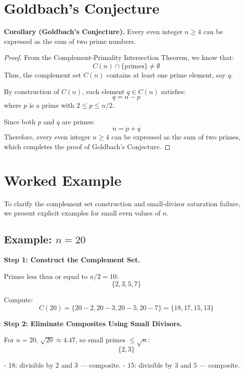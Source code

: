 \documentclass[11pt]{article}
\begin{document}
	
	\section{Goldbach's Conjecture}
	
	\textbf{Corollary (Goldbach’s Conjecture).}  
	Every even integer \( n \geq 4 \) can be expressed as the sum of two prime numbers.
	
	\begin{proof}
		From the Complement-Primality Intersection Theorem, we know that:
		\[
		C(n) \cap \{\text{primes}\} \neq \emptyset
		\]
		Thus, the complement set \( C(n) \) contains at least one prime element, say \( q \).
		
		By construction of \( C(n) \), each element \( q \in C(n) \) satisfies:
		\[
		q = n - p
		\]
		where \( p \) is a prime with \( 2 \leq p \leq n/2 \).
		
		Since both \( p \) and \( q \) are primes:
		\[
		n = p + q
		\]
		Therefore, every even integer \( n \geq 4 \) can be expressed as the sum of two primes, which completes the proof of Goldbach’s Conjecture.
	\end{proof}

	
	
	\section{Worked Example}
	
	To clarify the complement set construction and small-divisor saturation failure, we present explicit examples for small even values of \( n \).
	
	\subsection*{Example: \( n = 20 \)}
	
	\textbf{Step 1: Construct the Complement Set.}
	
	Primes less than or equal to \( n/2 = 10 \):
	\[
	\{2, 3, 5, 7\}
	\]
	
	Compute:
	\[
	C(20) = \{20 - 2, 20 - 3, 20 - 5, 20 - 7\} = \{18, 17, 15, 13\}
	\]
	
	\textbf{Step 2: Eliminate Composites Using Small Divisors.}
	
	For \( n = 20 \), \(\sqrt{20} \approx 4.47\), so small primes \( \leq \sqrt{n} \):
	\[
	\{2, 3\}
	\]
	
	- \( 18 \): divisible by \( 2 \) and \( 3 \) — composite.
	- \( 15 \): divisible by \( 3 \) and \( 5 \) — composite.
	
\end{document}
